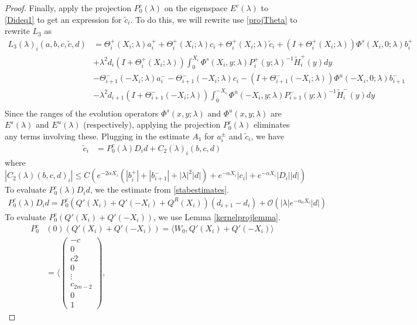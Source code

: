 \documentclass[thesis.tex]{subfiles}
\begin{document}
\begin{lemma}
\begin{proof}
Finally, apply the projection $P_0^c(\lambda)$ on the eigenspace $E^c(\lambda)$ to \eqref{Dideq1} to get an expression for $\tilde{c}_i$. To do this, we will rewrite use \eqref{projTheta} to rewrite $L_3$ as
\begin{align*}
L_3(\lambda)_i(a, b, c, \tilde{c}, d) &= \Theta_i^+(X_i; \lambda)a_i^+ + \Theta_i^+(X_i; \lambda)c_i + \Theta_i^+(X_i; \lambda)\tilde{c}_i + (I + \Theta_i^+(X_i; \lambda))\Phi^s(X_i, 0; \lambda) b_i^+ \\
&+ \lambda^2 d_i (I + \Theta_i^+(X_i; \lambda)) \int_0^{X_i} \Phi^s(X_i, y; \lambda) P_i^+(y; \lambda)^{-1} \tilde{H}_i^+(y) dy \\
&- \Theta_{i+1}^-(-X_i; \lambda)a_i^- - \Theta_{i+1}^-(-X_i; \lambda)c_i - (I + \Theta_{i+1}^-(-X_i; \lambda)) \Phi^u(-X_i, 0; \lambda) b_{i+1}^- \\ &- \lambda^2 d_{i+1} (I + \Theta_{i+1}^-(-X_i; \lambda)) \int_0^{-X_i} \Phi^u(-X_i, y; \lambda) P_{i+1}^-(y; \lambda)^{-1} \tilde{H}_i^-(y) dy \\
\end{align*}
Since the ranges of the evolution operators $\Phi^s(x, y; \lambda)$ and $\Phi^u(x, y; \lambda)$ are $E^s(\lambda)$ and $E^u(\lambda)$ (respectively), applying the projection $P_0^c(\lambda)$ eliminates any terms involving these. Plugging in the estimate $A_1$ for $a_i^\pm$ and $\tilde{c}_i$, we have
\begin{align*}
\tilde{c}_i &= P_0^c(\lambda) D_i d + C_2(\lambda)_i(b, c, d)
\end{align*}
where
\[
|C_2(\lambda)(b, c, d)_i| \leq 
C \left( e^{-2 \alpha X_i} (|b_i^+| + |b_{i+1}^-| + |\lambda|^2 |d|) + e^{-\alpha X_i}|c_i| + e^{-\alpha X_i}|D_i||d| \right)
\]
To evaluate $P_0^c(\lambda) D_i d$, we the estimate from \eqref{stabestimates}.
\begin{align*}
P_0^c(\lambda) D_i d = 
P_0^c(Q'(X_i) + Q'(-X_i) + Q^R(X_i))(d_{i+1} - d_i) + \mathcal{O}(|\lambda|e^{-\alpha_0 X_i}|d|)
\end{align*}
To evaluate $P_0^c (Q'(X_i) + Q'(-X_i))$, we use Lemma \eqref{kernelprojlemma}.
\begin{align*}
P_0^c&(0)(Q'(X_i) + Q'(-X_i)) = \langle W_0, Q'(X_i) + Q'(-X_i) \rangle \\
&= \langle \begin{pmatrix} -c \\ 0 \\ c2 \\ 0 \\ \vdots \\ c_{2m-2} \\ 0 \\ 1 \end{pmatrix},

\end{align*}
\end{proof}
\end{lemma}
\end{document}
